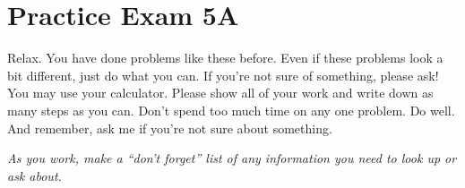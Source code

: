
\section*{Practice Exam 5A}  

Relax.  You have done problems like these before.  Even if these problems look a bit different, just do what you can.  If you're not sure of something, please ask! You may use your calculator.  Please show all of your work and write down as many steps as you can.  Don't spend too much time on any one problem.  Do well.  And remember, ask me if you're not sure about something. \bigskip

\noindent \emph{As you work, make a ``don't forget'' list of any information you need to look up or ask about.} 

\noindent \hrulefill
\bigskip

